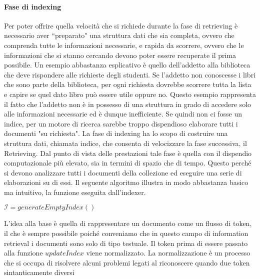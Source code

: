 \paragraph{Fase di indexing}
Per poter offrire quella velocità che si richiede durante la fase di retrieving è necessario aver ``preparato"
una struttura dati che sia completa, ovvero che comprenda tutte le informazioni necessarie, e 
rapida da scorrere, ovvero che le informazioni che si stanno cercando devono poter essere recuperate
il prima possibile.  Un esempio abbastanza esplicativo è quello dell'addetto alla biblioteca che deve rispondere
alle richieste degli studenti. Se l'addetto non conoscesse i libri che sono parte della biblioteca, per ogni richiesta
dovrebbe scorrere tutta la lista e capire se quel dato libro può essere utile oppure no.
Questo esempio rappresenta il fatto che l'addetto non è in possesso di una struttura in grado
di accedere solo alle informazioni necessarie ed è dunque inefficiente.
Se quindi non ci fosse un indice, per un motore di ricerca sarebbe troppo dispendioso elaborare tutti
i documenti "su richiesta".
La fase di indexing ha lo scopo di costruire una struttura dati, chiamata indice, che consenta
di velocizzare la fase successiva, il Retrieving.
Dal punto di vista delle prestazioni tale fase è quella con il  dispendio computazionale
più elevato, sia in termini di spazio che di tempo.
Questo perché si devono analizzare tutti i documenti della collezione ed eseguire una serie di elaborazioni
su di essi.
Il seguente algoritmo illustra in modo abbastanza basico ma intuitivo, la funzione eseguita dall'indexer.
\begin{algorithm}[h]
	\small
	\DontPrintSemicolon
	\BlankLine
	$\mathcal{I} = generateEmptyIndex()$\;
	\caption{\textsc{}}
	\label{alg:indexing}
\end{algorithm}
L'idea alla base è quella di rappresentare un documento come un flusso di token, il che è sempre possibile
poiché conveniamo che in questo campo di information retrieval i documenti sono solo di tipo testuale.
Il token prima di essere passato alla funzione $updateIndex$ viene normalizzato. La normalizzazione è un processo
che si occupa di risolvere alcuni problemi legati al riconoscere quando due token sintanticamente diversi
